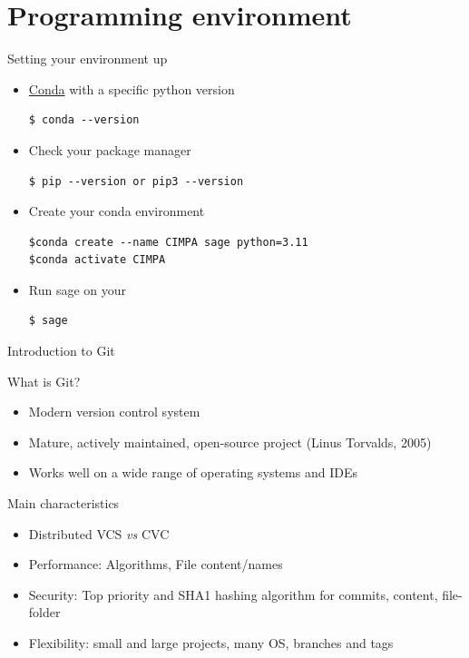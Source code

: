 \documentclass[10pt]{beamer}
\begin{document}
\section[Programming environment]{\textbf{Programming environment}} 

\begin{frame}[fragile]{Setting your environment up}

\begin{itemize}
\item \href{https://docs.conda.io/projects/miniconda/en/latest/}{Conda} with a specific python version
\begin{lstlisting}[style=advancedshell]
$ conda --version 
\end{lstlisting}
\item Check your package manager 
\begin{lstlisting}[style=advancedshell, numbers=none]
$ pip --version or pip3 --version 
\end{lstlisting}

\item Create your conda environment
\begin{lstlisting}[style=advancedshell]
$conda create --name CIMPA sage python=3.11
$conda activate CIMPA
\end{lstlisting}
\item Run sage on your 
\begin{lstlisting}[style=advancedshell, numbers=none]
$ sage
\end{lstlisting}
\end{itemize}

\end{frame}

\begin{frame}{Introduction to Git}
\begin{block}{What is Git?}
\begin{itemize}
	\item Modern version control system
	\item Mature, actively maintained, open-source project (Linus Torvalds, 2005)
	\item Works well on a wide range of operating systems and IDEs
\end{itemize}
\end{block}
\begin{block}{Main characteristics}
\begin{itemize}
	\item Distributed VCS \emph{vs} CVC 
	\item Performance: Algorithms, File content/names
	\item Security: Top priority and SHA1 hashing algorithm  for commits, content, file-folder
	\item Flexibility: small and large projects, many OS, branches and tags
\end{itemize}
\end{block}

\end{frame}
\end{document}
